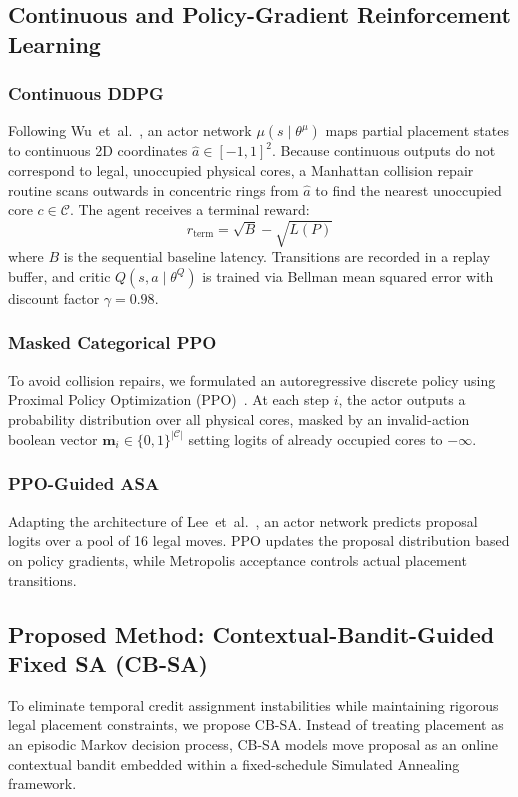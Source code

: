 \documentclass[10pt,conference]{IEEEtran}
\begin{document}
\subsection{Continuous and Policy-Gradient Reinforcement Learning}

\subsubsection{Continuous DDPG}
Following Wu~et~al.~\cite{wu2020todaes}, an actor network $\mu(s \mid \theta^\mu)$ maps partial placement states to continuous 2D coordinates $\hat{a} \in [-1, 1]^2$. Because continuous outputs do not correspond to legal, unoccupied physical cores, a Manhattan collision repair routine scans outwards in concentric rings from $\hat{a}$ to find the nearest unoccupied core $c \in \mathcal{C}$. The agent receives a terminal reward:
\begin{equation}
  r_{\text{term}} = \sqrt{B} - \sqrt{L(P)}
  \label{eq:ddpg-reward}
\end{equation}
where $B$ is the sequential baseline latency. Transitions are recorded in a replay buffer, and critic $Q(s, a \mid \theta^Q)$ is trained via Bellman mean squared error with discount factor $\gamma = 0.98$.

\subsubsection{Masked Categorical PPO}
To avoid collision repairs, we formulated an autoregressive discrete policy using Proximal Policy Optimization (PPO)~\cite{schulman2017ppo}. At each step $i$, the actor outputs a probability distribution over all physical cores, masked by an invalid-action boolean vector $\mathbf{m}_i \in \{0, 1\}^{|\mathcal{C}|}$ setting logits of already occupied cores to $-\infty$.

\subsubsection{PPO-Guided ASA}
Adapting the architecture of Lee~et~al.~\cite{rl_based_sa_2025}, an actor network predicts proposal logits over a pool of 16 legal moves. PPO updates the proposal distribution based on policy gradients, while Metropolis acceptance controls actual placement transitions.

\subsection{Proposed Method: Contextual-Bandit-Guided Fixed SA (CB-SA)}
To eliminate temporal credit assignment instabilities while maintaining rigorous legal placement constraints, we propose CB-SA. Instead of treating placement as an episodic Markov decision process, CB-SA models move proposal as an online contextual bandit embedded within a fixed-schedule Simulated Annealing framework.
\end{document}
